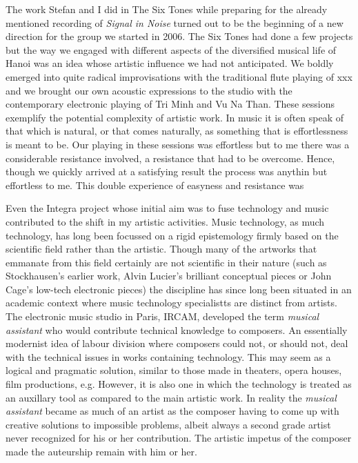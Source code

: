 \documentclass[a4paper]{article}
\begin{document}
The work Stefan and I did in The Six Tones while preparing for the already mentioned recording of \emph{Signal in Noise} turned out to be the beginning of a new direction for the group we started in 2006. The Six Tones had done a few projects but the way we engaged with different aspects of the diversified musical life of Hanoi was an idea whose artistic influence we had not anticipated. We boldly emerged into quite radical improvisations with the traditional flute playing of xxx and we brought our own acoustic expressions to the studio with the contemporary electronic playing of Tri Minh and Vu Na Than. These sessions exemplify the potential complexity of artistic work. In music it is often speak of that which is natural, or that comes naturally, as something that is effortlessness is meant to be. Our playing in these sessions was effortless but to me there was a considerable resistance involved, a resistance that had to be overcome. Hence, though we quickly arrived at a satisfying result the process was anythin but effortless to me. This double experience of easyness and resistance was 

Even the Integra project whose initial aim was to fuse technology and music contributed to the shift in my artistic activities. Music technology, as much technology, has long been focussed on a rigid epistemology firmly based on the scientific field rather than the artistic. Though many of the artworks that emmanate from this field certainly are not scientific in their nature (such as Stockhausen's earlier work, Alvin Lucier's brilliant conceptual pieces or John Cage's low-tech electronic pieces) the discipline has since long been situated in an academic context where music technology specialistts are distinct from artists. The electronic music studio in Paris, IRCAM, developed the term \emph{musical assistant} who would contribute technical knowledge to composers. An essentially modernist idea of labour division where composers could not, or should not, deal with the technical issues in works containing technology. This may seem as a logical and pragmatic solution, similar to those made in theaters, opera houses, film productions, e.g. However, it is also one in which the technology is treated as an auxillary tool as compared to the main artistic work. In reality the \emph{musical assistant} became as much of an artist as the composer having to come up with creative solutions to impossible problems, albeit always a second grade artist never recognized for his or her contribution. The artistic impetus of the composer made the auteurship remain with him or her.
\end{document}
